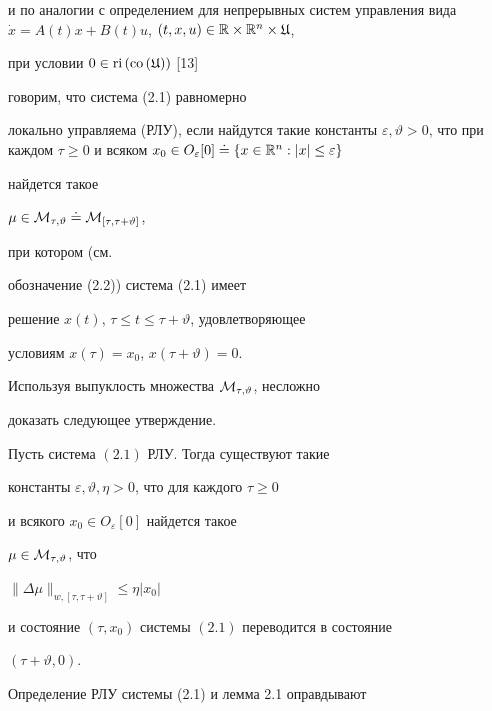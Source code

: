 и по аналогии с определением для непрерывных систем управления вида $\Dot


x=A(t)x+B(t)u$, $(t,x,u)\in\bR\times\bR^n\times\frak U$,


при условии $0\in\mathrm{ri}\,(\mathrm{co}\,(\frak U))$ [13] 


говорим, что система (2.1) равномерно


локально управляема (РЛУ), если найдутся такие константы $\varepsilon,


\vartheta>0$, что при каждом $\tau\ge 0$ и всяком $x_{0}\in


O_{\varepsilon}[0]\doteq\{x\in\bR^n:|x|\le\varepsilon\}$


найдется такое


$\mu\in\cal M_{\tau,\vartheta}\doteq\cal M_{[\tau,\tau+\vartheta]}$, 


при котором (см.


обозначение (2.2)) система (2.1) имеет


решение $x(t)$, $\tau\le t\le\tau+\vartheta$, удовлетворяющее


условиям $x(\tau)=x_0$, $x(\tau+\vartheta)=0$.





Используя выпуклость множества $\cal M_{\tau,\vartheta}$, несложно


доказать следующее утверждение.





\begin{lems}


Пусть система $(2.1)$ РЛУ. Тогда существуют такие


константы $\varepsilon,\vartheta,\eta>0$, что для каждого $\tau\ge0$ 


и всякого $x_0\in O_\varepsilon[0]$ найдется такое


$\mu\in\cal M_{\tau,\vartheta}$, что


$\|\Delta\mu\|_{w,[\tau,\tau+\vartheta]}\le\eta|x_{0}|$


и состояние $(\tau,x_0)$ системы $(2.1)$ переводится в состояние


$(\tau+\vartheta,0)$.


\end{lems}





Определение РЛУ системы (2.1) и лемма 2.1 оправдывают





